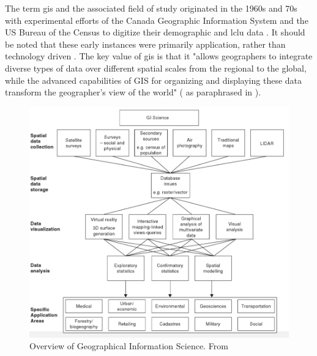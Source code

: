 The term \ac{gis} and the associated field of study originated in the 1960s and 70s with experimental efforts of the Canada Geographic Information System and the US Bureau of the Census to digitize their demographic and \ac{lclu} data \cite{goodchildGeographicInformationSystems1994}. It should be noted that these early instances were primarily application, rather than technology driven \cite{goodchildGeographicalInformationScience1992}. The key value of \ac{gis} is that it "allows geographers to integrate diverse types of data over different spatial scales from the regional to the global, while the advanced capabilities of GIS for organizing and displaying these data transform the geographer's view of the world" (\cite{tomlinsonPRESIDENTIALADDRESSGEOGRAPHIC1989} as paraphrased in \cite{vereginComputerInnovationAdoption1994}).

\begin{figure}[!htb]
	\centering
	\includegraphics[scale=0.4]{Figures/chap2/GIScience.png}
	\caption[Overview of Geographical Information Science]{Overview of Geographical Information Science. From \cite{fotheringhamGeographicInformationScience2007}}
	\label{fig:giscience}
\end{figure}

